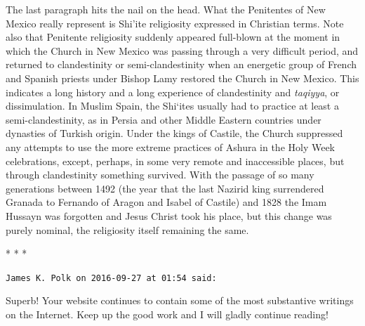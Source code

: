 The last paragraph hits the nail on the head. What the Penitentes of New Mexico really represent is Shi'ite religiosity expressed in Christian terms. Note also that Penitente religiosity suddenly appeared full-blown at the moment in which the Church in New Mexico was passing through a very difficult period, and returned to clandestinity or semi-clandestinity when an energetic group of French and Spanish priests under Bishop Lamy restored the Church in New Mexico. This indicates a long history and a long experience of clandestinity and \emph{taqiyya}, or dissimulation. In Muslim Spain, the Shi`ites usually had to practice at least a semi-clandestinity, as in Persia and other Middle Eastern countries under dynasties of Turkish origin. Under the kings of Castile, the Church suppressed any attempts to use the more extreme practices of Ashura in the Holy Week celebrations, except, perhaps, in some very remote and inaccessible places, but through clandestinity something survived. With the passage of so many generations between 1492 (the year that the last Nazirid king surrendered Granada to Fernando of Aragon and Isabel of Castile) and 1828 the Imam Hussayn was forgotten and Jesus Christ took his place, but this change was purely nominal, the religiosity itself remaining the same.


\begin{center}* * *\end{center}

\begin{footnotesize}
\begin{sffamily}
\texttt{James K. Polk on 2016-09-27 at 01:54 said:}

Superb! Your website continues to contain some of the most substantive writings on the Internet. Keep up the good work and I will gladly continue reading!


\hfill

\end{sffamily}
\end{footnotesize}

